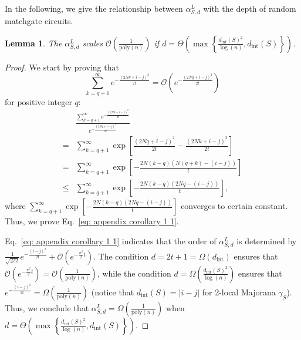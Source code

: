 \documentclass[showpacs,twocolumn,aps,prx,long bibliography,superscriptaddress,notitlepage]{revtex4-1}
\newtheorem{lemma}{Lemma}
\begin{document}
In the following, we give the relationship between $\alpha_{S,d}^L$ with the depth of random matchgate circuits.
\begin{lemma}
    \label{corollary: 1}
    The $\alpha_{S,d}^L$ scales $\mathcal{O}\left( \frac{1}{\mathrm{poly}(n)}\right)$ if $d = \Theta\left(\max\left\{ \frac{d_{\text{int}}(S)^2}{\log(n)} , d_{\text{int}}(S)\right\}\right)$.
\end{lemma}
\begin{proof}
    We start by proving that
    \begin{equation}
    \label{eq: appendix corollary 1 1}
        \sum_{k=q+1}^{\infty} e^{-\frac{(2Nk+i-j)^2}{2t}}  = \mathcal{O}\left(e^{-\frac{(2Nq+i-j)^2}{2t}}\right)
    \end{equation}
    for positive integer $q$:
    \begin{align}
        &\frac{\sum_{k=q+1}^{\infty} e^{-\frac{(2Nk+i-j)^2}{2t}}}{e^{-\frac{(2Nq+i-j)^2}{2t}}} \\
        =& \sum_{k=q+1}^{\infty} \exp\left[\frac{(2Nq+i-j)^2}{2t}-\frac{(2Nk+i-j)^2}{2t} \right]\\
        =& \sum_{k=q+1}^{\infty} \exp\left[-\frac{2N(k-q)(N(q+k) -(i-j))}{t}\right] \\
        \leq& \sum_{k=q+1}^{\infty} \exp\left[-\frac{2N(k-q)(2Nq -(i-j))}{t}\right],
    \end{align}
    where $\sum_{k=q+1}^{\infty} \exp\left[-\frac{2N(k-q)(2Nq -(i-j))}{t}\right]$ converges to certain constant. Thus, we prove Eq.~\eqref{eq: appendix corollary 1 1}.

    Eq.~\eqref{eq: appendix corollary 1 1} indicates that the order of $\alpha_{S,d}^L$ is determined by $\frac{1}{\sqrt{2\pi t}}  e^{-\frac{(i-j)^2}{2t}}+\mathcal{O}\left(e^{-\frac{\pi^2}{2}t}\right).$
    The condition $d = 2t+1 = \Omega(d_{\text{int}})$ ensures that $\mathcal{O}\left(e^{-\frac{\pi^2}{2}t}\right) =\mathcal{O}\left(\frac{1}{\mathrm{poly}(n)}\right) $, while the condition $d = \Omega(\frac{d_{\text{int}}(S)^2}{\log(n)} )$ ensures that $e^{-\frac{(i-j)^2}{2t}} =\Omega\left(\frac{1}{\mathrm{poly}(n)}\right) $ (notice that $d_\text{int}(S) = |i-j|$ for 2-local Majorana $\gamma_S$). Thus, we conclude that $\alpha_{S,d}^L = \Omega\left( \frac{1}{\mathrm{poly}(n)}\right)$ when $d = \Theta\left(\max\left\{ \frac{d_{\text{int}}(S)^2}{\log(n)} , d_{\text{int}}(S)\right\}\right)$. 
    
\end{proof}
\end{document}
